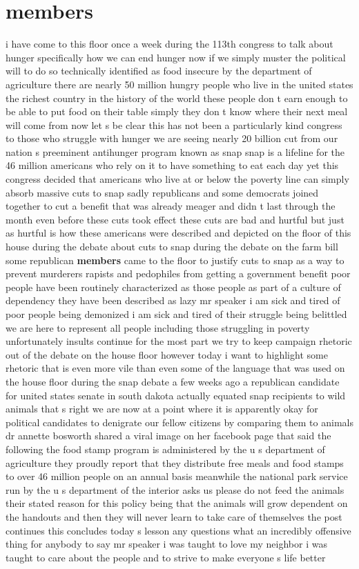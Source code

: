 \documentclass{article}
\begin{document}
\section*{members}
i have come to this floor once a week during the 113th congress to talk about hunger specifically how we can end hunger now if we simply muster the political will to do so technically identified as food insecure by the department of agriculture there are nearly 50 million hungry people who live in the united states the richest country in the history of the world these people don t earn enough to be able to put food on their table simply they don t know where their next meal will come from now let s be clear this has not been a particularly kind congress to those who struggle with hunger we are seeing nearly 20 billion cut from our nation s preeminent antihunger program known as snap snap is a lifeline for the 46 million americans who rely on it to have something to eat each day yet this congress decided that americans who live at or below the poverty line can simply absorb massive cuts to snap sadly republicans and some democrats joined together to cut a benefit that was already meager and didn t last through the month even before these cuts took effect these cuts are bad and hurtful but just as hurtful is how these americans were described and depicted on the floor of this house during the debate about cuts to snap during the debate on the farm bill some republican {\bf \color{red} members} came to the floor to justify cuts to snap as a way to prevent murderers rapists and pedophiles from getting a government benefit poor people have been routinely characterized as those people as part of a culture of dependency they have been described as lazy mr speaker i am sick and tired of poor people being demonized i am sick and tired of their struggle being belittled we are here to represent all people including those struggling in poverty unfortunately insults continue for the most part we try to keep campaign rhetoric out of the debate on the house floor however today i want to highlight some rhetoric that is even more vile than even some of the language that was used on the house floor during the snap debate a few weeks ago a republican candidate for united states senate in south dakota actually equated snap recipients to wild animals that s right we are now at a point where it is apparently okay for political candidates to denigrate our fellow citizens by comparing them to animals dr annette bosworth shared a viral image on her facebook page that said the following the food stamp program is administered by the u s department of agriculture they proudly report that they distribute free meals and food stamps to over 46 million people on an annual basis meanwhile the national park service run by the u s department of the interior asks us please do not feed the animals their stated reason for this policy being that the animals will grow dependent on the handouts and then they will never learn to take care of themselves the post continues this concludes today s lesson any questions what an incredibly offensive thing for anybody to say mr speaker i was taught to love my neighbor i was taught to care about the people and to strive to make everyone s life better 
\end{document}
